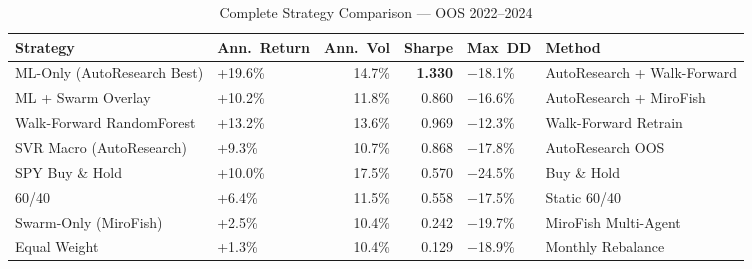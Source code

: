 \begin{table}
\caption{Complete Strategy Comparison --- OOS 2022--2024}
\label{tab:final_comparison}
\begin{tabular}{llrrll}
\toprule
Strategy & Ann.~Return & Ann.~Vol & Sharpe & Max~DD & Method \\
\midrule
ML-Only (AutoResearch Best) & +19.6\% & 14.7\% & \textbf{1.330} & $-$18.1\% & AutoResearch + Walk-Forward \\
ML + Swarm Overlay & +10.2\% & 11.8\% & 0.860 & $-$16.6\% & AutoResearch + MiroFish \\
Walk-Forward RandomForest & +13.2\% & 13.6\% & 0.969 & $-$12.3\% & Walk-Forward Retrain \\
SVR Macro (AutoResearch) & +9.3\% & 10.7\% & 0.868 & $-$17.8\% & AutoResearch OOS \\
SPY Buy \& Hold & +10.0\% & 17.5\% & 0.570 & $-$24.5\% & Buy \& Hold \\
60/40 & +6.4\% & 11.5\% & 0.558 & $-$17.5\% & Static 60/40 \\
Swarm-Only (MiroFish) & +2.5\% & 10.4\% & 0.242 & $-$19.7\% & MiroFish Multi-Agent \\
Equal Weight & +1.3\% & 10.4\% & 0.129 & $-$18.9\% & Monthly Rebalance \\
\bottomrule
\end{tabular}
\end{table}
